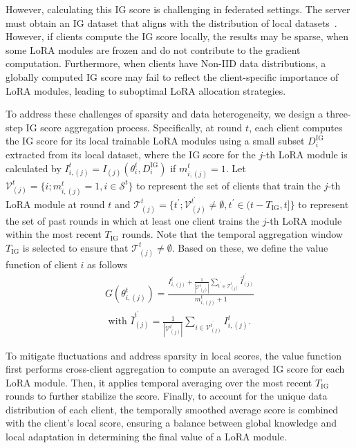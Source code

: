 \documentclass[sigconf]{acmart}
\begin{document}

However, calculating this IG score is challenging in federated settings. The server must obtain an IG dataset that aligns with the distribution of local datasets~\cite{zhu2021data}. However, if clients compute the IG score locally, the results may be sparse, when some LoRA modules are frozen and do not contribute to the gradient computation. Furthermore, when clients have Non-IID data distributions, a globally computed IG score may fail to reflect the client-specific importance of LoRA modules, leading to suboptimal LoRA allocation strategies. 

To address these challenges of sparsity and data heterogeneity, we design a three-step IG score aggregation process. Specifically, at round $t$, each client computes the IG score for its local trainable LoRA modules 
using a small subset $D_i^{\text{IG}}$ extracted from its local dataset, where the IG score for the $j$-th LoRA module is calculated by $I_{i,(j)}^t = I_{(j)} (\boldsymbol{\mathcal{\theta}}_i^{t}, D_i^{\text{IG}}) $ if $m_{i, (j)}^t = 1$.  
Let $\mathcal{V}_{(j)}^t = \{i; m_{i, (j)}^t = 1, i\in\mathcal{S}^t\}$ to represent the set of clients that train the $j$-th LoRA module at round \( t \) and $\mathcal{T}_{(j)}^t = \{t^\prime; \mathcal{V}_{(j)}^{t^\prime}\neq \emptyset, t^\prime \in (t-T_{\text{IG}}, t]\}$ to represent the set of past rounds in which at least one client trains the $j$-th LoRA module within the most recent \( T_{\text{IG}} \) rounds. Note that the temporal aggregation window$T_{\text{IG}}$ is selected to ensure that $\mathcal{T}_{(j)}^{t}\neq \emptyset$. Based on these, we define the value function of client $i$ as follows
\begin{align}\label{eq:valuefunction}
    {G}(\boldsymbol{\mathcal{\theta}}_{i, (j)}^t) = \frac{I_{i,(j)}^t + \frac{1}{|\mathcal{T}_{(j)}^t|}\sum_{t^\prime\in \mathcal{T}_{(j)}^t} \bar{I}_{(j)}^{t^\prime}}{{m_{i, (j)}^t + 1}} \nonumber\\ \text{ with } \bar{I}_{(j)}^{t^\prime} = \frac{1}{|\mathcal{V}_{(j)}^{t^\prime}|}\sum_{i\in \mathcal{V}_{(j)}^{t^\prime}} I_{i,(j)}^t.
\end{align}

To mitigate fluctuations and address sparsity in local scores, the value function first performs {cross-client aggregation} to compute an averaged IG score for each LoRA module. Then, it applies {temporal averaging} over the most recent \( T_{\text{IG}} \) rounds to further stabilize the score. Finally, to account for the unique data distribution of each client, the {temporally smoothed average score} is combined with the {client’s local score}, ensuring a balance between global knowledge and local adaptation in determining the final value of a LoRA module. %
\end{document}
